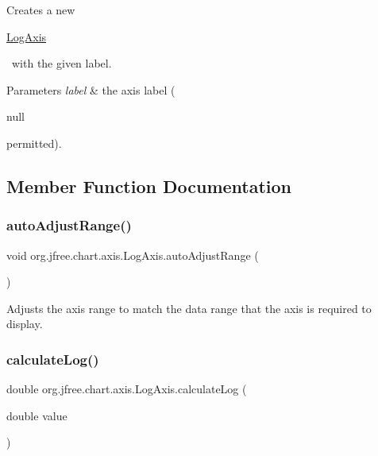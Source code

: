 Creates a new
\begin{DoxyCode}
\mbox{\hyperlink{classorg_1_1jfree_1_1chart_1_1axis_1_1_log_axis_af75e86e78639fb98a2c7e1c44c100c0c}{LogAxis}} 
\end{DoxyCode}
  with the given label.


\begin{DoxyParams}{Parameters}
{\em label} & the axis label (
\begin{DoxyCode}
null 
\end{DoxyCode}
 permitted). \\
\hline
\end{DoxyParams}


\subsection{Member Function Documentation}
\mbox{\label{classorg_1_1jfree_1_1chart_1_1axis_1_1_log_axis_ad85aea53b1d4ac0e9e5e45a2bac3fc61}} 
\subsubsection{\texorpdfstring{auto\+Adjust\+Range()}{autoAdjustRange()}}
{\footnotesize\ttfamily void org.\+jfree.\+chart.\+axis.\+Log\+Axis.\+auto\+Adjust\+Range (\begin{DoxyParamCaption}{ }\end{DoxyParamCaption})\hspace{0.3cm}{\ttfamily [protected]}}

Adjusts the axis range to match the data range that the axis is required to display. \mbox{\label{classorg_1_1jfree_1_1chart_1_1axis_1_1_log_axis_ad0dbcac62b133e033ce54a998eab3bd5}} 
\subsubsection{\texorpdfstring{calculate\+Log()}{calculateLog()}}
{\footnotesize\ttfamily double org.\+jfree.\+chart.\+axis.\+Log\+Axis.\+calculate\+Log (\begin{DoxyParamCaption}\item[{double}]{value }\end{DoxyParamCaption})}

